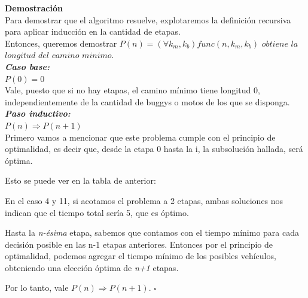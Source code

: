 {\large\textbf{Demostración}}\\
Para demostrar que el algoritmo resuelve, explotaremos la definición recursiva para aplicar inducción en la cantidad de etapas.\\
Entonces, queremos demostrar $P(n)=(\forall k_m, k_b) func(n, k_m, k_b)$ $obtiene$ $la$ $longitud$ $del$ $camino$ $minimo$.\\

\textbf{\emph{Caso base:}}\\
$P(0) = 0$\\
Vale, puesto que si no hay etapas, el camino mínimo tiene longitud 0, independientemente de la cantidad de buggys o motos de los que se disponga.\\

\textbf{\emph{Paso inductivo:}}\\
$P(n)\Rightarrow P(n+1)$\\
Primero vamos a mencionar que este problema cumple con el principio de optimalidad, es decir que, desde la etapa 0 hasta la i, la subsoluci\'on hallada, ser\'a \'optima.

Esto se puede ver en la tabla de anterior:

En el caso 4 y 11, si acotamos el problema a 2 etapas, ambas soluciones nos indican que el tiempo total ser\'ia 5, que es \'optimo.

Hasta la \emph{n-ésima} etapa, sabemos que contamos con el tiempo m\'inimo para cada decisi\'on posible en las n-1 etapas anteriores. Entonces por el principio de optimalidad, podemos agregar el tiempo m\'inimo de los posibles veh\'iculos, obteniendo una elecci\'on \'optima de \emph{n+1} etapas.



Por lo tanto, vale $P(n) \Rightarrow P(n+1)$. $\square$\\

